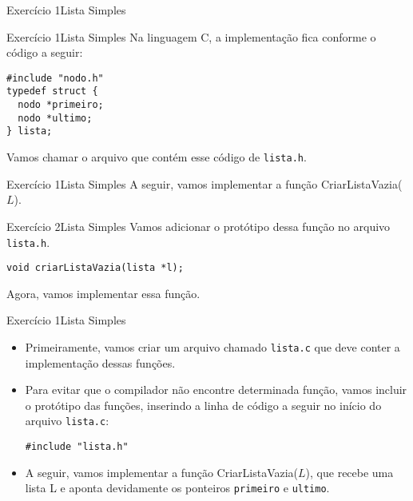 \documentclass[aspectratio=169]{beamer}
\begin{document}

\begin{frame}{Exercício 1}{Lista Simples}
\begin{algorithm}[H]
\caption{Lista} 
\label{Lista}
\end{algorithm} 
\end{frame}


\begin{frame}[fragile]{Exercício 1}{Lista Simples}
Na linguagem C, a implementação fica conforme o código a seguir:
\begin{lstlisting}[style=CStyle]
#include "nodo.h"
typedef struct {
  nodo *primeiro;
  nodo *ultimo;
} lista;
\end{lstlisting}  
Vamos chamar o arquivo que contém esse código de \verb|lista.h|.
\end{frame}


\begin{frame}[fragile]{Exercício 1}{Lista Simples}
A seguir, vamos implementar a função CriarListaVazia($L$).
\end{frame}


\begin{frame}[fragile]{Exercício 2}{Lista Simples}
Vamos adicionar o protótipo dessa função no arquivo \verb|lista.h|.
\begin{lstlisting}[style=CStyle]
void criarListaVazia(lista *l);
\end{lstlisting}  
Agora, vamos implementar essa função. 
\end{frame}



\begin{frame}[fragile]{Exercício 1}{Lista Simples}
\begin{itemize}
\item Primeiramente, vamos criar um arquivo chamado \verb|lista.c| que deve conter a implementação dessas funções.
\item Para evitar que o compilador não encontre determinada função, vamos incluir o protótipo das funções, inserindo a linha de código a seguir no início do arquivo \verb|lista.c|:
\begin{lstlisting}[style=CStyle]
#include "lista.h"
\end{lstlisting}  
\item A seguir, vamos implementar a função CriarListaVazia($L$), que recebe uma lista L e aponta devidamente os ponteiros \verb|primeiro| e \verb|ultimo|. 
\end{itemize} 
\end{frame}
\end{document}
